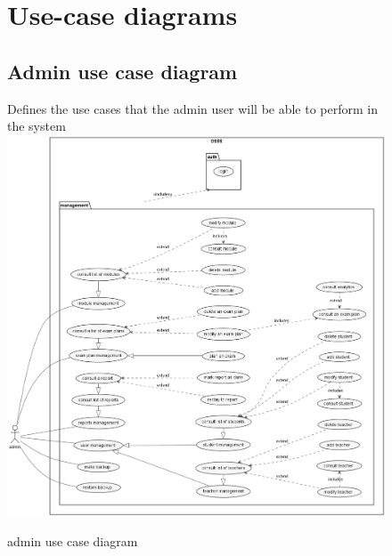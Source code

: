 \documentclass[]{uc2pfecaneva}
\begin{document}
    \begin{figure}
        \raggedright\section{Use-case diagrams}
        \subsection{Admin use case diagram}
        Defines the use cases that the admin user will be able to perform in the system
        \centering
        \includegraphics[width=\textwidth]{images/admin_UCD}
        \caption{admin use case diagram}
    \end{figure}
    \clearpage
\end{document}
